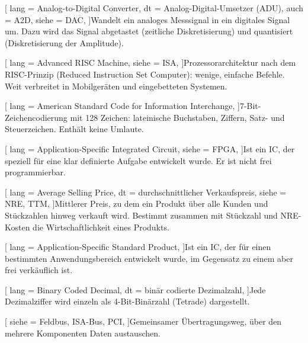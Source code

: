 %
%

[
  lang  = Analog-to-Digital Converter,
  dt    = Analog-Digital-Umsetzer (ADU),
  auch  = A2D,
  siehe = DAC,
]{Wandelt ein analoges Messsignal in ein digitales Signal um. Dazu wird das Signal abgetastet (zeitliche Diskretisierung) und quantisiert (Diskretisierung der Amplitude).}

[
  lang  = Advanced RISC Machine,
  siehe = ISA,
]{Prozessorarchitektur nach dem RISC-Prinzip (Reduced Instruction Set Computer): wenige, einfache Befehle. Weit verbreitet in Mobilgeräten und eingebetteten Systemen.}

[
  lang  = American Standard Code for Information Interchange,
]{7-Bit-Zeichencodierung mit 128 Zeichen: lateinische Buchstaben, Ziffern, Satz- und Steuerzeichen. Enthält keine Umlaute.}

[
  lang  = Application-Specific Integrated Circuit,
  siehe = FPGA,
]{Ist ein IC, der speziell für eine klar definierte Aufgabe entwickelt wurde. Er ist nicht frei programmierbar.}

[
  lang  = Average Selling Price,
  dt    = durchschnittlicher Verkaufspreis,
  siehe = {NRE, TTM},
]{Mittlerer Preis, zu dem ein Produkt über alle Kunden und Stückzahlen hinweg verkauft wird. Bestimmt zusammen mit Stückzahl und NRE-Kosten die Wirtschaftlichkeit eines Produkts.}

[
  lang  = Application-Specific Standard Product,
]{Ist ein IC, der für einen bestimmten Anwendungsbereich entwickelt wurde, im Gegensatz zu einem  aber frei verkäuflich ist.}

[
  lang  = Binary Coded Decimal,
  dt    = binär codierte Dezimalzahl,
]{Jede Dezimalziffer wird einzeln als 4-Bit-Binärzahl (Tetrade) dargestellt.}

[
  siehe = {Feldbus, ISA-Bus, PCI},
]{Gemeinsamer Übertragungsweg, über den mehrere Komponenten Daten austauschen.}

